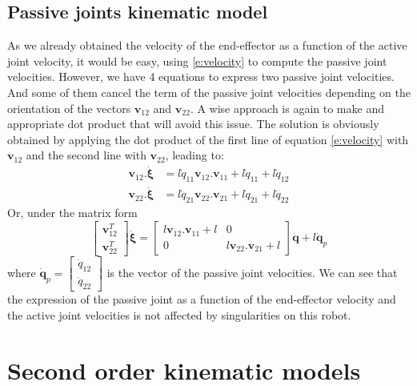 \documentclass[a4paper]{article}
\begin{document}
\subsection{Passive joints kinematic model}
%
As we already obtained the velocity of the end-effector as a function of the active joint velocity, it would be easy, using \eqref{e:velocity} to compute the passive joint velocities. However, we have 4 equations to express two passive joint velocities. And some of them cancel the term of the passive joint velocities depending on the orientation of the vectors $\mathbf{v}_{12}$ and $\mathbf{v}_{22}$. A wise approach is again to make and appropriate dot product that will avoid this issue. The solution is obviously obtained by applying the dot product of the first line of equation \eqref{e:velocity} with $\mathbf{v}_{12}$ and the second line with $\mathbf{v}_{22}$, leading to:
\begin{equation}
    \begin{aligned}
        \mathbf{v}_{12}.\dot{\boldsymbol{\xi}} &= l\dot{q}_{11}\mathbf{v}_{12}.\mathbf{v}_{11} + l\dot{q}_{11} + l\dot{q}_{12}\\
        \mathbf{v}_{22}.\dot{\boldsymbol{\xi}} &= l\dot{q}_{21}\mathbf{v}_{22}.\mathbf{v}_{21} + l\dot{q}_{21} + l\dot{q}_{22}    
    \end{aligned}
\end{equation}
%
Or, under the matrix form
%
\begin{equation}
    \begin{bmatrix}
        \mathbf{v}_{12}^T\\ \mathbf{v}_{22}^T
    \end{bmatrix}\dot{\boldsymbol{\xi}}
    =
    \begin{bmatrix}
        l\mathbf{v}_{12}.\mathbf{v}_{11} + l & 0\\
        0 & l\mathbf{v}_{22}.\mathbf{v}_{21} + l
    \end{bmatrix}
    \dot{\mathbf{q}} + l \dot{\mathbf{q}}_p
\end{equation}
%
where $\dot{\mathbf{q}}_p = \begin{bmatrix}
    \dot{q}_{12} \\ \dot{q}_{22}
\end{bmatrix}$
is the vector of the passive joint velocities. We can see that the expression of the passive joint as a function of the end-effector velocity and the active joint velocities is not affected by singularities on this robot.
%
\section{Second order kinematic models}
%
\end{document}
